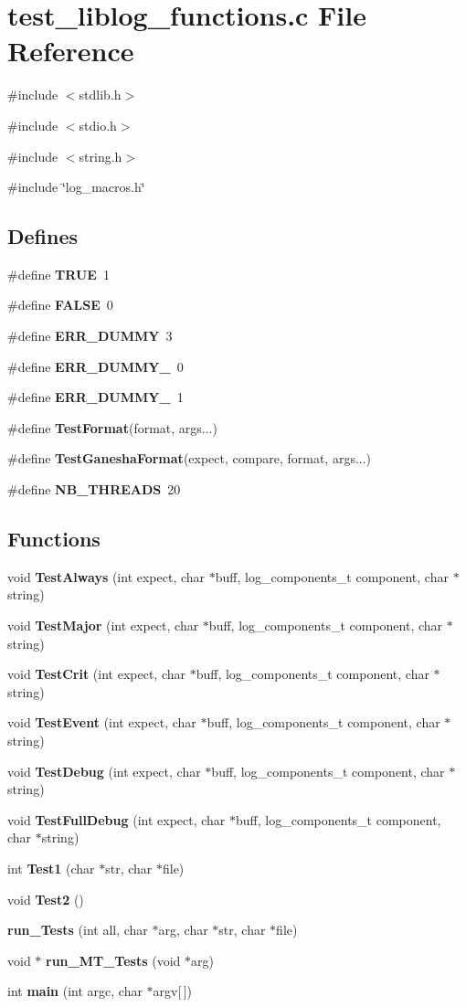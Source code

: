 \section{test\_\-liblog\_\-functions.c File Reference}
\label{test__liblog__functions_8c}
{\ttfamily \#include $<$stdlib.h$>$}\par
{\ttfamily \#include $<$stdio.h$>$}\par
{\ttfamily \#include $<$string.h$>$}\par
{\ttfamily \#include \char`\"{}log\_\-macros.h\char`\"{}}\par
\subsection*{Defines}
\begin{DoxyCompactItemize}
\item 
\#define {\bf TRUE}~1
\item 
\#define {\bf FALSE}~0
\item 
\#define {\bf ERR\_\-DUMMY}~3
\item 
\#define {\bf ERR\_\-DUMMY\_}~0
\item 
\#define {\bf ERR\_\-DUMMY\_}~1
\item 
\#define {\bf TestFormat}(format, args...)
\item 
\#define {\bf TestGaneshaFormat}(expect, compare, format, args...)
\item 
\#define {\bf NB\_\-THREADS}~20
\end{DoxyCompactItemize}
\subsection*{Functions}
\begin{DoxyCompactItemize}
\item 
void {\bf TestAlways} (int expect, char $\ast$buff, log\_\-components\_\-t component, char $\ast$string)
\item 
void {\bf TestMajor} (int expect, char $\ast$buff, log\_\-components\_\-t component, char $\ast$string)
\item 
void {\bf TestCrit} (int expect, char $\ast$buff, log\_\-components\_\-t component, char $\ast$string)
\item 
void {\bf TestEvent} (int expect, char $\ast$buff, log\_\-components\_\-t component, char $\ast$string)
\item 
void {\bf TestDebug} (int expect, char $\ast$buff, log\_\-components\_\-t component, char $\ast$string)
\item 
void {\bf TestFullDebug} (int expect, char $\ast$buff, log\_\-components\_\-t component, char $\ast$string)
\item 
int {\bf Test1} (char $\ast$str, char $\ast$file)
\item 
void {\bf Test2} ()
\item 
{\bf run\_\-Tests} (int all, char $\ast$arg, char $\ast$str, char $\ast$file)
\item 
void $\ast$ {\bf run\_\-MT\_\-Tests} (void $\ast$arg)
\item 
int {\bf main} (int argc, char $\ast$argv[$\,$])
\end{DoxyCompactItemize}


